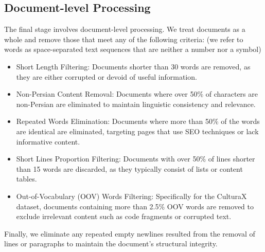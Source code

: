 \subsection{Document-level Processing}
The final stage involves document-level processing. We treat documents as a whole and remove those that meet any of the following criteria: (we refer to words as space-separated text sequences that are neither a number nor a symbol)
\begin{itemize}
    \item Short Length Filtering: Documents shorter than 30 words are removed, as they are either corrupted or devoid of useful information.

    \item Non-Persian Content Removal: Documents where over 50\% of characters are non-Persian are eliminated to maintain linguistic consistency and relevance.

    \item Repeated Words Elimination: Documents where more than 50\% of the words are identical are eliminated, targeting pages that use SEO techniques or lack informative content.

    \item Short Lines Proportion Filtering: Documents with over 50\% of lines shorter than 15 words are discarded, as they typically consist of lists or content tables.

    \item Out-of-Vocabulary (OOV) Words Filtering: Specifically for the CulturaX \citep{nguyen2023culturax} dataset, documents containing more than 2.5\% OOV words are removed to exclude irrelevant content such as code fragments or corrupted text.
\end{itemize} 

Finally, we eliminate any repeated empty newlines resulted from the removal of lines or paragraphs to maintain the document's structural integrity.

